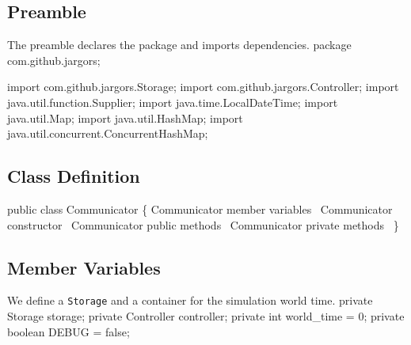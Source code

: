 \documentclass{article}
\def\nwendcode{\endtrivlist \endgroup}      %
\let\nwdocspar=\par
\begin{document}
\subsection{Preamble}
\label{sec:preamble}
The preamble declares the package and imports dependencies.
\nwenddocs{}\endmoddef{}
package com.github.jargors;
\nwendcode{}\nwdocspar
\nwenddocs{}\plusendmoddef
import com.github.jargors.Storage;
import com.github.jargors.Controller;
import java.util.function.Supplier;
import java.time.LocalDateTime;
import java.util.Map;
import java.util.HashMap;
import java.util.concurrent.ConcurrentHashMap;
\nwendcode{}\nwdocspar

\subsection{Class Definition}
\label{sec:class-definition}
\nwenddocs{}\endmoddef{}
public class Communicator \{
  \LA{}\code{}Communicator\edoc{} member variables~{\nwtagstyle{}}\RA{}
  \LA{}\code{}Communicator\edoc{} constructor~{\nwtagstyle{}}\RA{}
  \LA{}\code{}Communicator\edoc{} public methods~{\nwtagstyle{}}\RA{}
  \LA{}\code{}Communicator\edoc{} private methods~{\nwtagstyle{}}\RA{}
\}
\nwendcode{}\nwdocspar

\subsection{Member Variables}
\label{sec:member-variables}
We define a {\tt{}Storage} and a container for the simulation world time.
\nwenddocs{}\endmoddef{}
private Storage storage;
private Controller controller;
private int world_time = 0;
private boolean DEBUG = false;
\eatline
{}\nwendcode{}\nwdocspar
\end{document}
